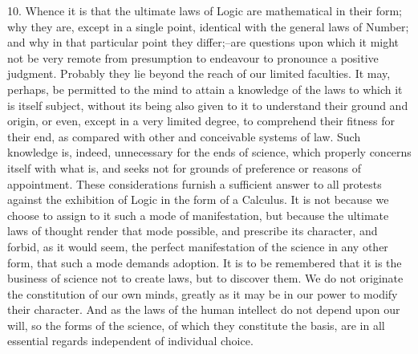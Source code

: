 \documentclass[oneside]{book}
\begin{document}
10. Whence it is that the ultimate laws of Logic are mathematical
in their form; why they are, except in a single point,
identical with the general laws of Number; and why in that particular
point they differ;--are questions upon which it might not
be very remote from presumption to endeavour to pronounce a
positive judgment. Probably they lie beyond the reach of our
limited faculties. It may, perhaps, be permitted to the mind to
attain a knowledge of the laws to which it is itself subject, without
its being also given to it to understand their ground and
origin, or even, except in a very limited degree, to comprehend
their fitness for their end, as compared with other and conceivable
systems of law. Such knowledge is, indeed, unnecessary for the
ends of science, which properly concerns itself with what is, and
seeks not for grounds of preference or reasons of appointment.
These considerations furnish a sufficient answer to all protests
against the exhibition of Logic in the form of a Calculus. It is
not because we choose to assign to it such a mode of manifestation,
but because the ultimate laws of thought render that mode
possible, and prescribe its character, and forbid, as it would
seem, the perfect manifestation of the science in any other form,
that such a mode demands adoption. It is to be remembered
that it is the business of science not to create laws, but to discover
them. We do not originate the constitution of our own minds,
greatly as it may be in our power to modify their character.
And as the laws of the human intellect do not depend upon our
will, so the forms of the science, of which they constitute the basis,
are in all essential regards independent of individual choice.
\end{document}
